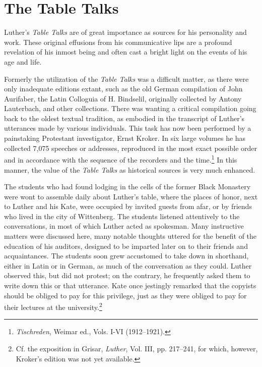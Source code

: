 \section{The Table Talks}

Luther’s \textit{Table Talks} are of great importance as sources for his
personality and work. These original effusions from his communicative
lips are a profound revelation of his inmost being and often cast a
bright light on the events of his age and life.

Formerly the utilization of the \textit{Table Talks} was a difficult matter,
as there were only inadequate editions extant, such as the old German
compilation of John Aurifaber, the Latin Colloguia of H. Bindselil,
originally collected by Antony Lauterbach, and other collections.
There was wanting a critical compilation going back to the oldest
textual tradition, as embodied in the transcript of Luther’s utterances
made by various individuals. This task has now been performed by a
painstaking Protestant investigator, Ernst Kroker. In six large volumes
he has collected 7,075 speeches or addresses, reproduced in the
most exact possible order and in accordance with the sequence of the
recorders and the time.\footnote{\textit{Tischreden}, Weimar ed., Vols. I-VI (1912--1921).}
In this manner, the value of the \textit{Table Talks}
as historical sources is very much enhanced.

The students who had found lodging in the cells of the former
Black Monastery were wont to assemble daily about Luther’s table,
where the places of honor, next to Luther and his Kate, were occupied
by invited guests from afar, or by friends who lived in the city
of Wittenberg. The students listened attentively to the conversations,
in most of which Luther acted as spokesman. Many instructive matters
were discussed here, many notable thoughts uttered for the benefit of
the education of his auditors, designed to be imparted later on to
their friends and acquaintances. The students soon grew accustomed
to take down in shorthand, either in Latin or in German, as much
of the conversation as they could. Luther observed this, but did not
protest; on the contrary, he frequently asked them to write down
this or that utterance. Kate once jestingly remarked that the copyists
should be obliged to pay for this privilege, just as they were obliged
to pay for their lectures at the university.\footnote
{Cf. the exposition in Grisar, \textit{Luther}, Vol. III, pp. 217--241, for which, however,
Kroker’s edition was not yet available.}

